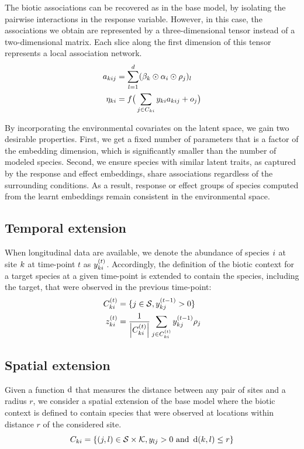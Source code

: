 \documentclass[10pt,a4paper]{article}
\begin{document}
The biotic associations can be recovered as in the base model, by isolating the pairwise interactions in the response variable. However, in this case, the associations we obtain are represented by a three-dimensional tensor instead of a two-dimensional matrix. Each slice along the first dimension of this tensor represents a local association network.
\begin{align*}
  a_{kij} &= \sum_{l=1}^{d} (\beta_{k} \odot \alpha_{i} \odot \rho_{j})_l \\
  \eta_{ki} &= f\big( \sum_{j \in C_{ki}} y_{ki}  a_{kij} + o_j\big)
\end{align*}

By incorporating the environmental covariates on the latent space, we gain two desirable properties. First, we get a fixed number of parameters that is a factor of the embedding dimension, which is significantly smaller than the number of modeled species. Second, we ensure species with similar latent traits, as captured by the response and effect embeddings, share associations regardless of the surrounding conditions. As a result, response or effect groups of species computed from the learnt embeddings remain consistent in the environmental space. 

\subsection{Temporal extension}
When longitudinal data are available, we denote the abundance of species $i$ at site $k$ at time-point $t$ as $y_{ki}^{(t)}$. Accordingly, the definition of the biotic context for a target species at a given time-point is extended to contain the species, including the target, that were observed in the previous time-point:
\begin{align*}
  C_{ki}^{(t)} &= \{j \in \mathcal{S}, y_{kj}^{(t-1)} > 0 \} \\
  z_{ki}^{(t)} &= \frac{1}{\left\lvert C_{ki}^{(t)}\right\rvert} \sum_{j \in C_{ki}^{(t)}} y_{kj}^{(t-1)}  \rho_{j}
\end{align*}

\subsection{Spatial extension}
Given a function $\operatorname{d}$ that measures the distance between any pair of sites and a radius $r$, we consider a spatial extension of the base model where the biotic context is defined to contain species that were observed at locations within distance $r$ of the considered site.
\begin{equation*}
  C_{ki} = \{(j, l) \in \mathcal{S} \times \mathcal{K}, y_{lj} > 0 \text{ and }  \operatorname{d}(k, l) \leq r\}
\end{equation*}
\end{document}
